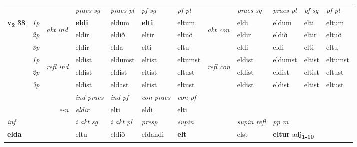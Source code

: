 \begin{longtable}[l]{X>{\footnotesize\itshape}llXXXXlXXXX}
 & &   & \textit{praes sg}  & \textit{praes pl}    & \textit{ pf sg} & \textit{pf pl} & & \textit{praes sg}  & \textit{praes pl}    & \textit{pf sg} & \textit{pf pl }  \\ \cmidrule{4-7} \cmidrule{9-12}
 \multirow{2}{*}{{{\textbf{v{\textsubscript{2}}} \Large{\textbf{38}}}}}  & 1p & \multirow{3}{*}{\begin{turn}{90}\textit{akt ind}\end{turn}} & \textbf{eldi} & eldum & \textbf{elti} & eltum & \multirow{3}{*}{\begin{turn}{90}\textit{akt con}\end{turn}} &eldi & eldum & elti & eltum\\*
 & 2p &  &  eldir  & eldið & eltir & eltuð & & eldir & eldið & eltir & eltuð \\*
 & 3p &  & eldir & elda & elti & eltu & & eldi & eldi& elti & eltu \\*
\cmidrule{4-7} \cmidrule{9-12}
 & 1p & \multirow{3}{*}{\begin{turn}{90}\textit{refl ind}\end{turn}}  & eldist & eldumst & eltist & eltumst & \multirow{3}{*}{\begin{turn}{90}\textit{refl con}\end{turn}}  &eldist & eldumst & eltist & eltumst \\*
 & 2p &  & eldist & eldist & eltist & eltust & &eldist & eldist & eltist & eltust \\*
 & 3p  & & eldist & eldast & eltist & eltust & & eldist & eldist& eltist & eltust \\*
\cmidrule{4-7} \cmidrule{9-12}

   && &  \textit{ind praes} & \textit{ind pf} & \textit{con praes} & \textit{con pf} \\*
\multicolumn{3}{r}{\textit{e-n}} & eldir & elti & eldi & elti \\*

\cmidrule{4-7}
   {\textit{inf}} & &  & \textit{i akt sg} & \textit{i akt pl}   & \textit{presp} & \textit{supin} && \textit{supin refl} & \textit{pp m} \\*
  {\textbf{elda}} & && eltu  & eldið   & eldandi &  \textbf{elt} && elst & \multicolumn{2}{l}{\textbf{eltur} adj\textbf{\textsubscript{1-10}}} \\*

\midrule


\end{longtable}
